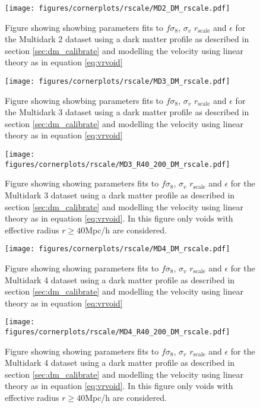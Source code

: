 \begin{figure}[H]
    \texttt{[image: figures/cornerplots/rscale/MD2\_DM\_rscale.pdf]}
    \caption{Figure showing showbing parameters fits to $f\sigma_8$, $\sigma_v$ $r_{\mathrm{scale}}$ and $\epsilon$ for the Multidark 2 dataset using a dark matter profile as described in section \ref{sec:dm_calibrate} and modelling the velocity using linear theory as in equation \ref{eq:vrvoid}}
    \label{fig:MD2DM}
\end{figure}

\begin{figure}[H]
    \texttt{[image: figures/cornerplots/rscale/MD3\_DM\_rscale.pdf]}
    \caption{Figure showing showbing parameters fits to $f\sigma_8$, $\sigma_v$ $r_{\mathrm{scale}}$ and $\epsilon$ for the Multidark 3 dataset using a dark matter profile as described in section \ref{sec:dm_calibrate} and modelling the velocity using linear theory as in equation \ref{eq:vrvoid}}
    \label{fig:MD3DM}
\end{figure}

\begin{figure}[H]
    \texttt{[image: figures/cornerplots/rscale/MD3\_R40\_200\_DM\_rscale.pdf]}
    \caption{Figure showing showing parameters fits to $f\sigma_8$, $\sigma_v$ $r_{\mathrm{scale}}$ and $\epsilon$ for the Multidark 3 dataset using a dark matter profile as described in section \ref{sec:dm_calibrate} and modelling the velocity using linear theory as in equation \ref{eq:vrvoid}. In this figure only voids with effective radius $r \geq 40$Mpc/h are considered.}
    \label{fig:MD3DMR40}
\end{figure}

\begin{figure}[H]
    \texttt{[image: figures/cornerplots/rscale/MD4\_DM\_rscale.pdf]}
    \caption{Figure showing showing parameters fits to $f\sigma_8$, $\sigma_v$ $r_{\mathrm{scale}}$ and $\epsilon$ for the Multidark 4 dataset using a dark matter profile as described in section \ref{sec:dm_calibrate} and modelling the velocity using linear theory as in equation \ref{eq:vrvoid}}
    \label{fig:MD4DM}
\end{figure}

\begin{figure}[H]
    \texttt{[image: figures/cornerplots/rscale/MD4\_R40\_200\_DM\_rscale.pdf]}
    \caption{Figure showing showing parameters fits to $f\sigma_8$, $\sigma_v$ $r_{\mathrm{scale}}$ and $\epsilon$ for the Multidark 4 dataset using a dark matter profile as described in section \ref{sec:dm_calibrate} and modelling the velocity using linear theory as in equation \ref{eq:vrvoid}. In this figure only voids with effective radius $r \geq 40$Mpc/h are considered.}
    \label{fig:MD4DMR40}
\end{figure}

